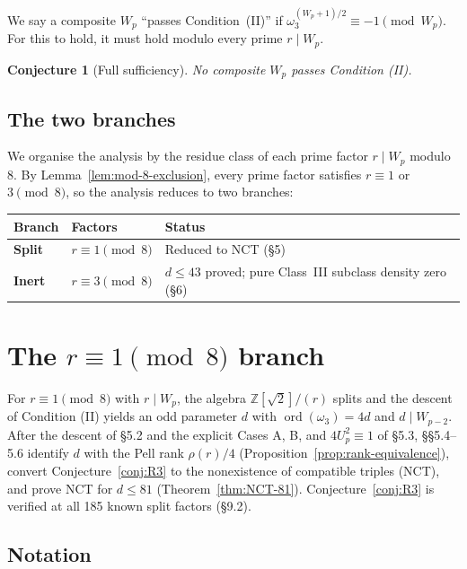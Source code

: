 \documentclass[12pt]{article}
\theoremstyle{plain}
\newtheorem{conjecture}[theorem]{Conjecture}
\theoremstyle{definition}
\theoremstyle{remark}
\begin{document}
We say a composite \(W_p\) ``passes Condition~(II)'' if
\(\omega_3^{(W_p+1)/2} \equiv -1 \pmod{W_p}\). For this to hold,
it must hold modulo every prime \(r \mid W_p\).

\begin{conjecture}[Full sufficiency]\label{conj:sufficiency}
No composite \(W_p\) passes
Condition (II).
\end{conjecture}


\subsection{The two branches}


We organise the analysis by the residue class of each prime
factor \(r \mid W_p\) modulo 8. By Lemma~\ref{lem:mod-8-exclusion},
every prime factor satisfies \(r \equiv 1\) or \(3 \pmod{8}\), so
the analysis reduces to two branches:

\begin{center}
\begin{tabular}{lll}
\hline
Branch & Factors & Status \\
\hline
\textbf{Split} & \(r \equiv 1 \pmod{8}\) & Reduced to NCT (\S5) \\
\textbf{Inert} & \(r \equiv 3 \pmod{8}\) & \(d \leq 43\) proved; pure Class~III subclass density zero (\S6) \\
\hline
\end{tabular}
\end{center}




\section{The \texorpdfstring{\(r \equiv 1 \pmod{8}\)}{r == 1 (mod 8)} branch}


For \(r \equiv 1 \pmod{8}\) with \(r \mid W_p\), the algebra
\(\mathbb{Z}[\sqrt{2}]/(r)\) splits and the descent of Condition (II)
yields an odd parameter \(d\) with \(\operatorname{ord}(\omega_3) = 4d\)
and \(d \mid W_{p-2}\). After the descent of \S5.2 and the explicit
Cases A, B, and \(4U_p^2 \equiv 1\) of \S5.3, \S\S5.4--5.6 identify
\(d\) with the Pell rank \(\rho(r)/4\) (Proposition~\ref{prop:rank-equivalence}), convert
Conjecture~\ref{conj:R3} to the nonexistence of compatible triples (NCT),
and prove NCT for \(d \leq 81\) (Theorem~\ref{thm:NCT-81}).
Conjecture~\ref{conj:R3} is verified at all 185 known split factors (\S9.2).

\subsection{Notation}
\end{document}
